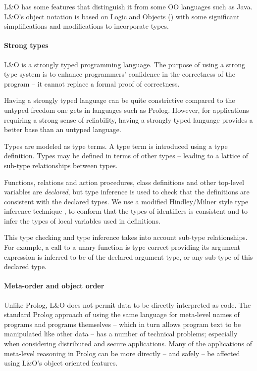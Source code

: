 L&O has some features that distinguish it from some OO languages such as Java\tm. L&O's object notation is based on Logic and Objects (\cite{fgm:92}) with some significant simplifications and modifications to incorporate types. 

\paragraph{Strong types}
L&O is a strongly typed programming language. The purpose of using a strong type system is to enhance programmers' confidence in the correctness of the program -- it cannot replace a formal proof of correctness.

Having a strongly typed language can be quite constrictive compared to the untyped freedom one gets in languages such as Prolog.  However, for applications requiring a strong sense of reliability, having a strongly typed language provides a better base than an untyped language.

Types are modeled as type terms. A type term is introduced using a type definition. Types may be defined in terms of other types -- leading to a lattice of sub-type relationships between types. 

Functions, relations and action procedures, class definitions and other top-level variables are \emph{declared}, but type inference is used to check that the definitions are consistent with the declared types. We use a modified Hindley/Milner style type inference technique \cite{hindley:69}, \cite{milner:78} to conform that the types of identifiers is consistent and to infer the types of local variables used in definitions.

This type checking and type inference takes into account sub-type relationships.  For example, a call to a unary function is type correct providing its argument expression  is inferred to be of the declared argument  type, or any sub-type of this  declared type.

\paragraph{Meta-order and object order}
Unlike Prolog, L&O does not permit data to be directly interpreted as code. The standard Prolog approach of using the same language for meta-level names of programs and programs themselves -- which in turn allows program text to be manipulated like other data -- has a number of technical problems; especially when considering distributed and secure applications. Many of the applications of meta-level reasoning in Prolog can be more directly -- and safely -- be affected using L&O's object oriented features.

